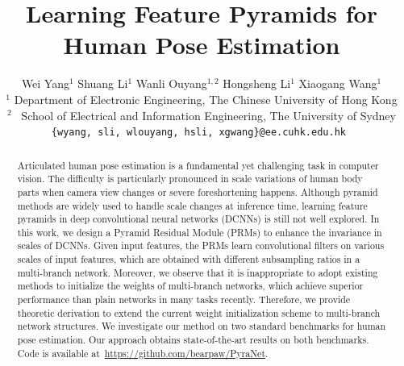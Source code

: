 \documentclass[10pt,twocolumn,letterpaper]{article}
\begin{document}
\title{Learning Feature Pyramids for Human Pose Estimation}

\author{
Wei Yang$^{1}$ \quad 
Shuang Li$^{1}$ \quad 
Wanli Ouyang$^{1,2}$ \quad 
Hongsheng Li$^{1}$ \quad
Xiaogang Wang$^{1}$ \\
$^{1}$ Department of Electronic Engineering, The Chinese University of Hong Kong\\
$^{2}$~ School of Electrical and Information Engineering, The University of Sydney \\
{\tt\small \{wyang, sli, wlouyang, hsli, xgwang\}@ee.cuhk.edu.hk  } \\
}

\maketitle
\thispagestyle{empty}


\begin{abstract}
Articulated human pose estimation is a fundamental yet challenging task in computer vision. 
The difficulty is particularly pronounced in scale variations of human body parts when camera view changes or severe foreshortening happens. 
Although pyramid methods are widely used to handle scale changes at inference time, learning feature pyramids in deep convolutional neural networks (DCNNs) is still not well explored. 
In this work, we design a Pyramid Residual Module (PRMs) to enhance the invariance in scales of DCNNs. 
Given input features, the PRMs learn convolutional filters on various scales of input features, which are obtained with different subsampling ratios in a multi-branch network. 
Moreover, we observe that it is inappropriate to adopt existing methods to initialize the weights of multi-branch networks, 
which achieve superior performance than plain networks in many tasks recently. 
Therefore, we provide theoretic derivation to extend the current weight initialization scheme to multi-branch network structures. 
We investigate our method on two standard benchmarks for human pose estimation. 
Our approach obtains state-of-the-art results on both benchmarks. 
Code is available at~\url{https://github.com/bearpaw/PyraNet}. 
 


\end{abstract}
\end{document}
